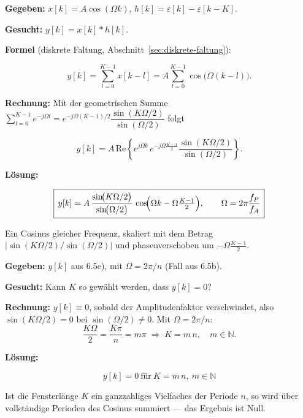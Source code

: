 \begin{beispiel}[6.5e) Systemantwort]

\textbf{Gegeben:} $x[k]=A\cos(\Omega k)$, $h[k]=\varepsilon[k]-\varepsilon[k-K]$.

\textbf{Gesucht:} $y[k]=x[k]*h[k]$.

\textbf{Formel} (diskrete Faltung, Abschnitt~\ref{sec:diskrete-faltung}):

$$
y[k]=\sum_{l=0}^{K-1} x[k-l]
    =A\sum_{l=0}^{K-1}\cos\!\bigl(\Omega(k-l)\bigr).
$$

\textbf{Rechnung:} Mit der geometrischen Summe
$\sum_{l=0}^{K-1}e^{-j\Omega l}=e^{-j\Omega(K-1)/2}\dfrac{\sin(K\Omega/2)}{\sin(\Omega/2)}$
folgt

$$
y[k]=A\,\mathrm{Re}\!\left\{e^{j\Omega k}\,e^{-j\Omega\frac{K-1}{2}}
     \frac{\sin(K\Omega/2)}{\sin(\Omega/2)}\right\}.
$$

\textbf{Lösung:}

$$
\boxed{\,y[k]=A\,\frac{\sin\!\bigl(K\Omega/2\bigr)}{\sin\!\bigl(\Omega/2\bigr)}\,
        \cos\!\Bigl(\Omega k-\Omega\tfrac{K-1}{2}\Bigr),\qquad
        \Omega=2\pi\frac{f_P}{f_A}\,}
$$

Ein Cosinus gleicher Frequenz, skaliert mit dem Betrag
$\bigl|\sin(K\Omega/2)/\sin(\Omega/2)\bigr|$ und phasenverschoben um
$-\Omega\tfrac{K-1}{2}$.

\end{beispiel}

\begin{beispiel}

\textbf{Gegeben:} $y[k]$ aus 6.5e), mit $\Omega=2\pi/n$ (Fall aus 6.5b).

\textbf{Gesucht:} Kann $K$ so gewählt werden, dass $y[k]=0$?

\textbf{Rechnung:} $y[k]\equiv 0$, sobald der Amplitudenfaktor verschwindet,
also $\sin(K\Omega/2)=0$ bei $\sin(\Omega/2)\neq 0$. Mit $\Omega=2\pi/n$:
$$
\frac{K\Omega}{2}=\frac{K\pi}{n}=m\pi \;\Longrightarrow\; K=m\,n,\quad m\in\mathbb{N}.
$$

\textbf{Lösung:}

$$
\boxed{\,y[k]=0 \ \text{für}\ K=m\,n,\ m\in\mathbb{N}\,}
$$

Ist die Fensterlänge $K$ ein ganzzahliges Vielfaches der Periode $n$, so
wird über vollständige Perioden des Cosinus summiert — das Ergebnis ist Null.

\end{beispiel}


